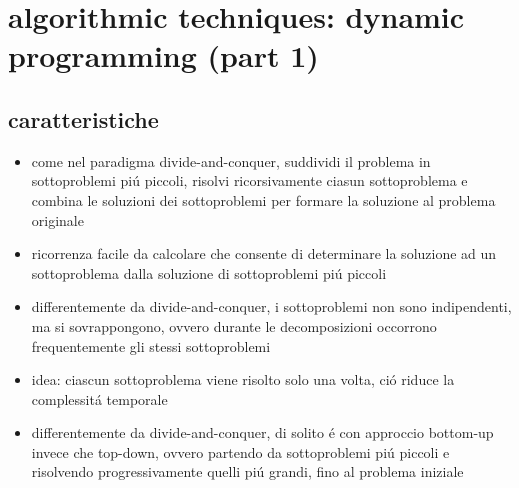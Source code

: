 \section*{algorithmic techniques: dynamic programming (part 1)}


\subsection*{caratteristiche}
\begin{flushleft}
	\begin{itemize}
		\item come nel paradigma divide-and-conquer, suddividi il problema in sottoproblemi pi\'u piccoli, risolvi ricorsivamente ciasun sottoproblema e combina le soluzioni dei sottoproblemi per formare la soluzione al problema originale
		\item ricorrenza facile da calcolare che consente di determinare la soluzione ad un sottoproblema dalla soluzione di sottoproblemi pi\'u piccoli
		\item differentemente da divide-and-conquer, i sottoproblemi non sono indipendenti, ma si sovrappongono, ovvero durante le decomposizioni occorrono frequentemente gli stessi sottoproblemi
		\item idea: ciascun sottoproblema viene risolto solo una volta, ci\'o riduce la complessit\'a temporale
		\item differentemente da divide-and-conquer, di solito \'e con approccio bottom-up invece che top-down, ovvero partendo da sottoproblemi pi\'u piccoli e risolvendo progressivamente quelli pi\'u grandi, fino al problema iniziale
	\end{itemize}
\end{flushleft}


